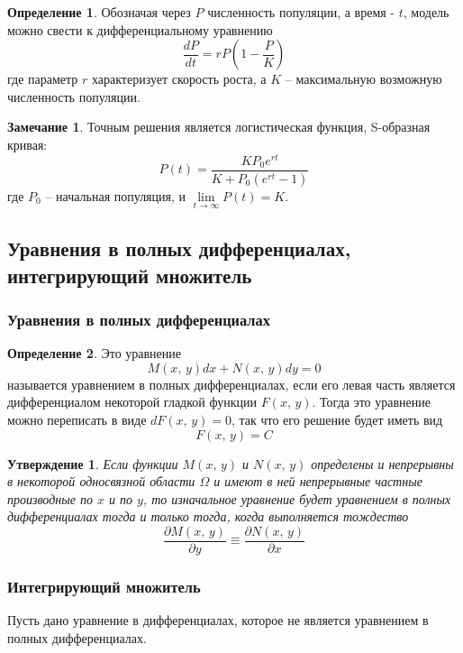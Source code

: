 \documentclass[a4paper,12pt]{article}
\theoremstyle{plain}
\newtheorem{proposition}{Утверждение}[section]
\theoremstyle{definition}
\newtheorem{definition}{Определение}[section]
\newtheorem*{note}{Замечание}
\theoremstyle{remark}
\begin{document}
\begin{definition}
	Обозначая через $P$ численность популяции, а время - $t$, модель можно свести к дифференциальному уравнению
	\[\frac{dP}{dt} = rP(1 - \frac{P}{K})\]
	где параметр $r$ характеризует скорость роста, а $K$ -- максимальную возможную численность популяции.
\end{definition}

\begin{note}
	Точным решения является логистическая функция, S-образная кривая:
	\[P(t) = \frac{KP_0e^{rt}}{K + P_0(e^{rt}-1)}\] где $P_0$ -- начальная популяция, и $\lim\limits_{t \to \infty} P(t) = K$.
\end{note}

\subsection{Уравнения в полных дифференциалах, интегрирующий множитель}
\subsubsection*{Уравнения в полных дифференциалах}
\begin{definition}
	Это уравнение
	\[M(x,\,y)dx + N(x,\,y)dy = 0\]
	называется уравнением в полных дифференциалах, если его левая часть является дифференциалом некоторой гладкой функции $F(x,\,y)$. Тогда это уравнение можно переписать в виде $dF(x,\,y) = 0$, так что его решение будет иметь вид
	\[F(x,\,y) = C\]
\end{definition}

\begin{proposition}
	Если функции $M(x,\,y)$ и $N(x,\,y)$ определены и непрерывны в некоторой односвязной области $\Omega$ и имеют в ней непрерывные частные производные по $x$ и по $y$, то изначальное уравнение будет уравнением в полных дифференциалах тогда и только тогда, когда выполняется тождество
	\[\frac{\partial M(x,\,y)}{\partial y} \equiv \frac{\partial N(x,\,y)}{\partial x}\]
\end{proposition}

\subsubsection*{Интегрирующий множитель}
Пусть дано уравнение в дифференциалах, которое не является уравнением в полных дифференциалах.
\end{document}
